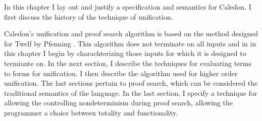 In this chapter I lay out and justify a specification and semantics 
for Caledon.  I first discuss the history of the technique of unification.

Caledon's unification and proof search algorithm is based on the method designed for Twelf by Pfenning
\citep{pfenning1991logic}.  This algorithm does not terminate on all inputs and in in this chapter 
I begin by charachterizing those inputs for which it is designed to termiante on.  In the next section, I describe
the techniques for evaluating terms to forms for unification.  I then describe the algorithm
used for higher order unification.  
The last sections pertain to proof search, which can be considered the traditional semantics of the language.
In the last section, I specify a technique for allowing the controlling nondeterminism during proof search, 
allowing the programmer a choice between totality and functionality.
